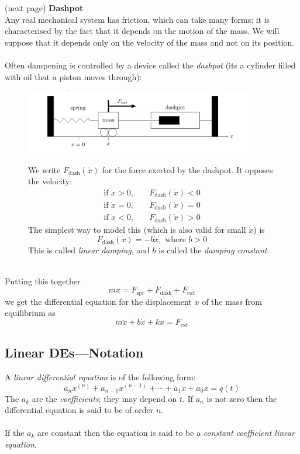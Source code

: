 \documentclass{report}
\begin{document}
(next page)
\newpage
\noindent\textbf{Dashpot}\\
Any real mechanical system has friction, which can take many forms; it is characterised by the fact that it
depends on the motion of the mass. We will suppose that
it depends only on the velocity of the mass and not on its
position.\\
\vspace{1mm}\\
Often dampening is controlled by a device called
the \textit{dashpot} (its a cylinder filled with oil that a piston moves through):
\begin{figure}[h]
\begin{center}
\includegraphics[width=10cm]{22}\\
\end{center}
We write $F_\text{dash}(\dot{x})$ for the force exerted by the dashpot. It opposes the velocity:
\begin{align*}
\text{if }\dot{x}>0,\quad&F_\text{dash}(\dot{x})<0\\
\text{if }\dot{x}=0,\quad&F_\text{dash}(\dot{x})=0\\
\text{if }\dot{x}<0,\quad&F_\text{dash}(\dot{x})>0
\end{align*}
The simplest way to model this (which is also valid for small $\dot{x}$) is
\begin{equation*}
F_\text{dash}(\dot{x})=-b\dot{x},\text{ where }b>0
\end{equation*}
This is called \textit{linear damping}, and $b$ is called the \textit{damping constant}.
\end{figure}\\
Putting this together
\begin{equation*}
m\ddot{x}=F_\text{spr}+F_\text{dash}+F_\text{ext}
\end{equation*}
we get the differential equation for the displacement $x$ of the mass from equilibrium as
\begin{equation*}
m\ddot{x}+b\dot{x}+kx=F_\text{ext}
\end{equation*}
\newpage

\subsection{Linear DEs---Notation}
A \textit{linear differential equation} is of the following form:
\begin{equation*}
a_nx^{(n)}+a_{n-1}x^{(n-1)}+\cdots+a_1\dot{x}+a_0x=q(t)
\end{equation*}
The $a_k$ are the \textit{coefficients}; they may depend on $t$. If $a_n$ is not
zero then the differential equation is said to be of order $n$.\\
\vspace{1mm}\\
If the $a_k$ are constant then the equation is said to be a \textit{constant coefficient linear equation}.
\end{document}

